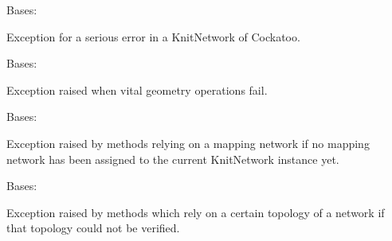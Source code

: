 \documentclass[letterpaper,10pt,english]{sphinxmanual}
\begin{document}

\begin{fulllineitems}
\label{\detokenize{cockatoo:cockatoo.exception.KnitNetworkError}}
Bases: {\hyperref[\detokenize{cockatoo:cockatoo.exception.CockatooException}]{}}

Exception for a serious error in a KnitNetwork of Cockatoo.

\end{fulllineitems}


\begin{fulllineitems}
\label{\detokenize{cockatoo:cockatoo.exception.KnitNetworkGeometryError}}
Bases: {\hyperref[\detokenize{cockatoo:cockatoo.exception.KnitNetworkError}]{}}

Exception raised when vital geometry operations fail.

\end{fulllineitems}


\begin{fulllineitems}
\label{\detokenize{cockatoo:cockatoo.exception.MappingNetworkError}}
Bases: {\hyperref[\detokenize{cockatoo:cockatoo.exception.KnitNetworkError}]{}}

Exception raised by methods relying on a mapping network if no mapping
network has been assigned to the current KnitNetwork instance yet.

\end{fulllineitems}


\begin{fulllineitems}
\label{\detokenize{cockatoo:cockatoo.exception.KnitNetworkTopologyError}}
Bases: {\hyperref[\detokenize{cockatoo:cockatoo.exception.KnitNetworkError}]{}}

Exception raised by methods which rely on a certain topology of a network
if that topology could not be verified.

\end{fulllineitems}
\end{document}
